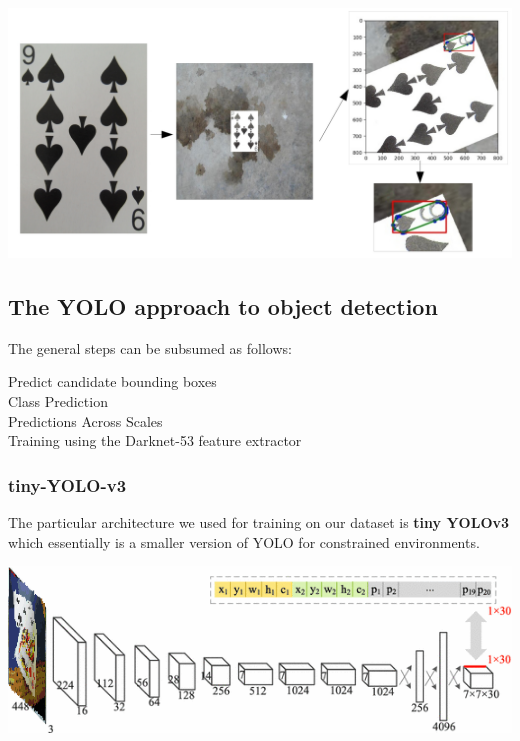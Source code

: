 \documentclass[a0,landscape]{a0poster}
\begin{document}
\begin{multicols}{3}
\vspace{1cm}
\begin{minipage}[b]{0.30\textwidth}
\includegraphics[width=\textwidth]{7-p}
\end{minipage}

\subsection*{The YOLO approach to object detection}
The general steps can be subsumed as follows:
\begin{description}
\item[Predict candidate bounding boxes]
\item[Class Prediction]
\item[Predictions Across Scales]
\item[Training using the Darknet-53 feature extractor]
\end{description}
\subsubsection*{tiny-YOLO-v3}

The particular architecture we used for training on our dataset is \textbf{tiny YOLOv3} which essentially is a smaller version of YOLO for constrained environments.
\begin{center}\vspace{1cm}
\includegraphics[width=0.9\linewidth]{tinyyolo}
\end{center}\vspace{1cm}

\end{multicols}
\end{document}
